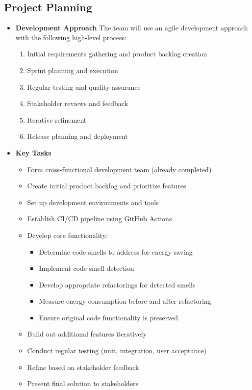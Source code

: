 \documentclass[12pt]{article}
\begin{document}
\subsection{Project Planning}
\begin{itemize}
 
  \item \textbf{Development Approach}
  The team will use an agile development approach with the following high-level process:
  \begin{enumerate}
    \item Initial requirements gathering and product backlog creation
    \item Sprint planning and execution
    \item Regular testing and quality assurance
    \item Stakeholder reviews and feedback
    \item Iterative refinement
    \item Release planning and deployment
  \end{enumerate}
  
 \item \textbf{Key Tasks}
  \begin{itemize}
    \item Form cross-functional development team (already completed) 
    \item Create initial product backlog and prioritize features
    \item Set up development environments and tools
    \item Establish CI/CD pipeline using GitHub Actions
    \item Develop core functionality:
      \begin{itemize}
        \item Determine code smells to address for energy saving
        \item Implement code smell detection
        \item Develop appropriate refactorings for detected smells
        \item Measure energy consumption before and after refactoring
        \item Ensure original code functionality is preserved
      \end{itemize}
    \item Build out additional features iteratively
    \item Conduct regular testing (unit, integration, user acceptance)
    \item Refine based on stakeholder feedback
    \item Present final solution to stakeholders


\end{itemize}
\end{itemize}
\end{document}

